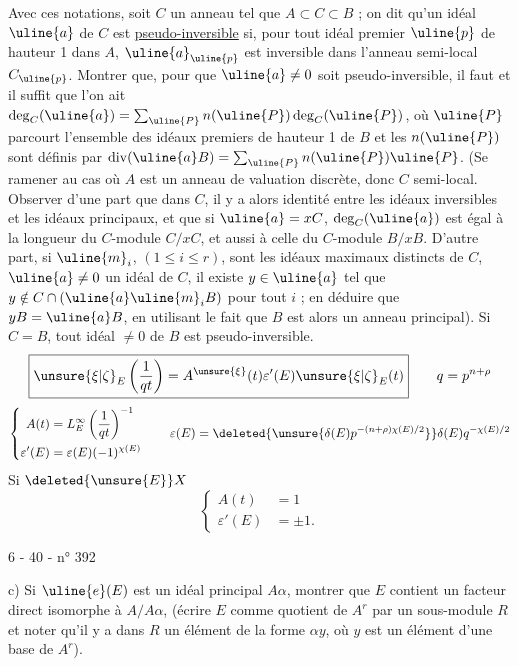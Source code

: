 Avec ces notations, soit $C$ un anneau tel que $A\subset C\subset B$ ; on dit qu'un idéal $\uline{a}$ de $C$ est \uline{pseudo-inversible} si, pour tout idéal premier $\uline{p}$ de hauteur 1 dans $A$, $\uline{a}_{\uline{p}}$ est inversible dans l'anneau semi-local $C_{\uline{p}}$. Montrer que, pour que $\uline{a}\ne0$ soit pseudo-inversible, il faut et il suffit que l'on ait $\deg_C(\uline{a})=\sum_{\uline{P}}n(\uline{P})\deg_C(\uline{P})$, où $\uline{P}$ parcourt l'ensemble des idéaux premiers de hauteur 1 de $B$ et les $n(\uline{P})$ sont définis par $\operatorname{div}(\uline{a}B)=\sum_{\uline{P}}n(\uline{P})\uline{P}$. (Se ramener au cas où $A$ est un anneau de valuation discrète, donc $C$ semi-local. Observer d'une part que dans $C$, il y a alors identité entre les idéaux inversibles et les idéaux principaux, et que si $\uline{a}=xC$, $\deg_C(\uline{a})$ est égal à la longueur du $C$-module $C/xC$, et aussi à celle du $C$-module $B/xB$. D'autre part, si $\uline{m}_i$, $(1\le i\le r)$, sont les idéaux maximaux distincts de $C$, $\uline{a}\ne0$ un idéal de $C$, il existe $y\in\uline{a}$ tel que $y\notin C\cap(\uline{a}\uline{m}_iB)$ pour tout $i$ ; en déduire que $yB=\uline{a}B$, en utilisant le fait que $B$ est alors un anneau principal).
Si $C=B$, tout idéal $\ne0$ de $B$ est pseudo-inversible.
\[
\boxed{\unsure{\xi|\zeta}_E\left(\frac1{qt}\right)=A^{\unsure{\xi}}(t)\varepsilon'(E)\unsure{\xi|\zeta}_E(t)}
\qquad q=p^{n+\rho}
\]
\[
\left\{\begin{aligned}
A(t)&=L_E^\infty\left(\frac1{qt}\right)^{-1}\\
\varepsilon'(E)&=\varepsilon(E)(-1)^{\chi(E)}
\end{aligned}\right.
\qquad \varepsilon(E)=\deleted{\unsure{\delta(E)p^{-(n+\rho)\chi(E)/2}}}\delta(E)q^{-\chi(E)/2}
\]
Si $\deleted{\unsure{E}}X$ 
\[
\left\{\begin{aligned}A(t)&=1\\\varepsilon'(E)&=\pm1.\end{aligned}\right.
\]
\begin{center}6 - 40 - \hfill n° 392\end{center}
c) Si $\uline{e}(E)$ est un idéal principal $A\alpha$, montrer que $E$ contient un facteur direct isomorphe à $A/A\alpha$, (écrire $E$ comme quotient de $A^r$ par un sous-module $R$ et noter qu'il y a dans $R$ un élément de la forme $\alpha y$, où $y$ est un élément d'une base de $A^r$).

